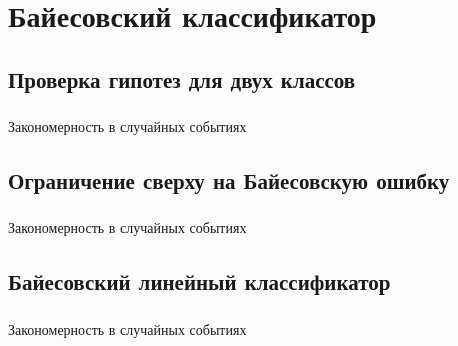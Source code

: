 \documentclass{beamer}
\begin{document}
\section{Байесовский классификатор}
\subsection{Проверка гипотез для двух классов}

\begin{frame}
  \frametitle{\insertsection}
  \framesubtitle{\insertsubsection}
  Закономерность в случайных событиях
\end{frame}

\subsection{Ограничение сверху на Байесовскую ошибку}

\begin{frame}
  \frametitle{\insertsection}
  \framesubtitle{\insertsubsection}
  Закономерность в случайных событиях
\end{frame}

\subsection{Байесовский линейный классификатор}

\begin{frame}
  \frametitle{\insertsection}
  \framesubtitle{\insertsubsection}
  Закономерность в случайных событиях
\end{frame}
\end{document}
